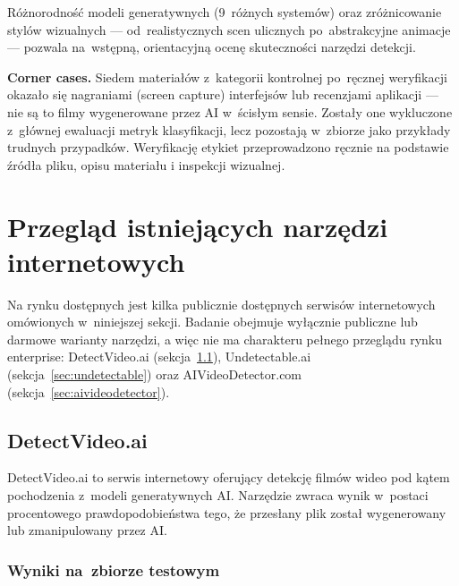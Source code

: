 R\'{o}\.{z}norodno\'{s}\'{c} modeli generatywnych (9~r\'{o}\.{z}nych system\'{o}w) oraz
zr\'{o}\.{z}nicowanie styl\'{o}w wizualnych --- od~realistycznych scen ulicznych
po~abstrakcyjne animacje --- pozwala na~wst\k{e}pn\k{a}, orientacyjn\k{a}
ocen\k{e} skuteczno\'{s}ci narz\k{e}dzi detekcji.

\textbf{Corner cases.}
Siedem materia\l{}\'{o}w z~kategorii kontrolnej po~r\k{e}cznej weryfikacji
okaza\l{}o si\k{e} nagraniami (screen capture) interfejs\'{o}w
lub recenzjami aplikacji --- nie s\k{a} to filmy wygenerowane przez AI
w~\'{s}cis\l{}ym sensie. Zosta\l{}y one wykluczone z~g\l{}\'{o}wnej ewaluacji
metryk klasyfikacji, lecz pozostaj\k{a} w~zbiorze jako przyk\l{}ady
trudnych przypadk\'{o}w. Weryfikacj\k{e} etykiet przeprowadzono ręcznie
na podstawie źródła pliku, opisu materiału i inspekcji wizualnej.

\section{Przegl\k{a}d istniej\k{a}cych narz\k{e}dzi internetowych}
\label{sec:przeglad_narzedzi}

Na rynku dost\k{e}pnych jest kilka publicznie dost\k{e}pnych serwis\'{o}w internetowych
om\'{o}wionych w~niniejszej sekcji. Badanie obejmuje wyłącznie publiczne lub darmowe
warianty narzędzi, a więc nie ma charakteru pełnego przeglądu rynku enterprise:
DetectVideo.ai (sekcja~\ref{sec:detectvideo}),
Undetectable.ai (sekcja~\ref{sec:undetectable})
oraz AIVideoDetector.com (sekcja~\ref{sec:aivideodetector}).

\subsection{DetectVideo.ai}
\label{sec:detectvideo}

DetectVideo.ai to serwis internetowy oferuj\k{a}cy detekcj\k{e} film\'{o}w wideo
pod k\k{a}tem pochodzenia z~modeli generatywnych AI.
Narz\k{e}dzie zwraca wynik w~postaci procentowego prawdopodobie\'{n}stwa
tego, \.{z}e przes\l{}any plik zosta\l{} wygenerowany lub zmanipulowany przez AI.

\subsubsection{Wyniki na~zbiorze testowym}

